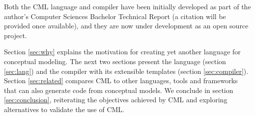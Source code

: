 Both the CML language and compiler have been initially developed as part of the author's Computer Sciences Bachelor Technical Report (a citation will be provided once available),
and they are now under development \cite{cml-repo} as an open source project.

Section \ref{sec:why} explains the motivation for creating yet another language for conceptual modeling.
The next two sections present the language (section \ref{sec:lang}) and the compiler with its extensible templates (section \ref{sec:compiler}).
Section \ref{sec:related} compares CML to other languages, tools and frameworks
that can also generate code from conceptual models.
We conclude in section \ref{sec:conclusion},
reiterating the objectives achieved by CML and exploring alternatives to validate the use of CML.
